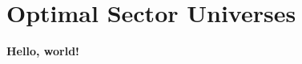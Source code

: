 \documentclass[../main.tex]{subfiles}
\begin{document}
    
\chapter{Optimal Sector Universes}
    
\textbf{Hello, world!}
\end{document}
